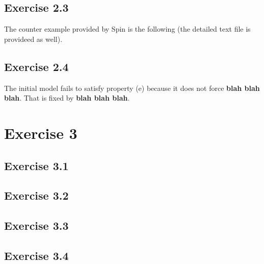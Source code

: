 \documentclass[12pt]{article}
\newcommand{\idea}[1]{\textcolor{darkyellow}{#1}}
\newcommand{\blah}{\textbf{blah blah blah}}
\begin{document}

\subsection*{Exercise 2.3}

\idea{The counter example provided by Spin is the following (the detailed text file is provideed as well).}


\subsection*{Exercise 2.4}

\idea{The initial model fails to satisfy property (e) because it does not force \blah{}.}
\idea{That is fixed by \blah{}.}

\section*{Exercise 3}

\subsection*{Exercise 3.1}


\subsection*{Exercise 3.2}


\subsection*{Exercise 3.3}


\subsection*{Exercise 3.4}

\end{document}
